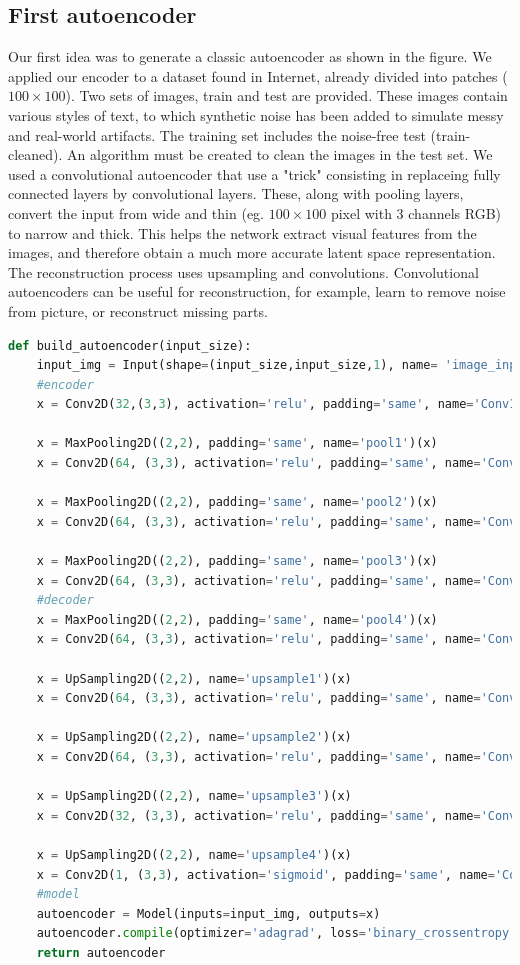 \documentclass[%
 reprint,
 amsmath,amssymb,
 aps,
]{revtex4-1}
\begin{document}
\subsection{First autoencoder} 
 Our first idea was to generate a classic autoencoder as shown in the figure. We applied our encoder to a dataset found in Internet, already divided into patches ($100 \times 100$). Two sets of images, train and test are provided. These images contain various styles of text, to which synthetic noise has been added to simulate messy and real-world artifacts. The training set includes the noise-free test (train-cleaned). An algorithm must be created to clean the images in the test set.
We used a convolutional autoencoder that use a "trick" consisting in replaceing fully connected layers by convolutional layers. These, along with pooling layers, convert the input from wide and thin (eg. $100 \times 100$ pixel with 3 channels RGB) to narrow and thick. This helps the network extract visual features from the images, and therefore obtain a much more accurate latent space representation. The reconstruction process uses upsampling and convolutions.
Convolutional autoencoders can be useful for reconstruction, for example, learn to remove noise from picture, or reconstruct missing parts.

\begin{lstlisting}[linewidth=\columnwidth,breaklines=true,language=python]
def build_autoencoder(input_size):
    input_img = Input(shape=(input_size,input_size,1), name= 'image_input')
    #encoder
    x = Conv2D(32,(3,3), activation='relu', padding='same', name='Conv1')(input_img)
 
    x = MaxPooling2D((2,2), padding='same', name='pool1')(x)
    x = Conv2D(64, (3,3), activation='relu', padding='same', name='Conv2')(x)

    x = MaxPooling2D((2,2), padding='same', name='pool2')(x) 
    x = Conv2D(64, (3,3), activation='relu', padding='same', name='Conv3')(x)

    x = MaxPooling2D((2,2), padding='same', name='pool3')(x) 
    x = Conv2D(64, (3,3), activation='relu', padding='same', name='Conv4')(x)
    #decoder
    x = MaxPooling2D((2,2), padding='same', name='pool4')(x) 
    x = Conv2D(64, (3,3), activation='relu', padding='same', name='Conv5')(x)
  
    x = UpSampling2D((2,2), name='upsample1')(x)
    x = Conv2D(64, (3,3), activation='relu', padding='same', name='Conv6')(x)

    x = UpSampling2D((2,2), name='upsample2')(x)
    x = Conv2D(64, (3,3), activation='relu', padding='same', name='Conv7')(x)

    x = UpSampling2D((2,2), name='upsample3')(x)
    x = Conv2D(32, (3,3), activation='relu', padding='same', name='Conv8')(x)

    x = UpSampling2D((2,2), name='upsample4')(x)
    x = Conv2D(1, (3,3), activation='sigmoid', padding='same', name='Conv9')(x)
    #model
    autoencoder = Model(inputs=input_img, outputs=x)
    autoencoder.compile(optimizer='adagrad', loss='binary_crossentropy')
    return autoencoder
\end{lstlisting}
\end{document}
